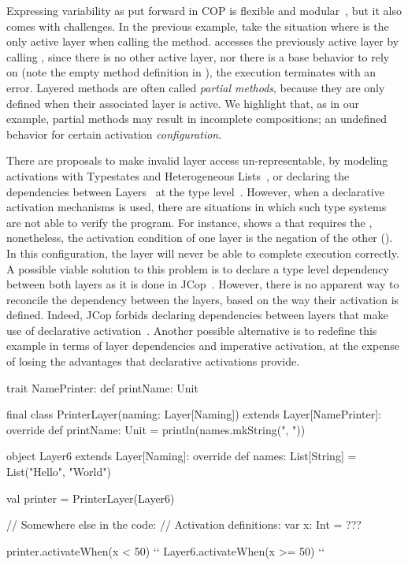 Expressing variability as put forward in \ac{COP} is flexible and modular~\cite{cardozo22}, but it also 
comes with challenges. In the previous example, take the situation where  is the only 
active layer when calling the  method.  accesses the previously active 
layer by calling , since there is no other active layer, nor there is a base behavior to 
rely on (note the empty method definition in ), the execution 
terminates with an error. Layered methods are often called 
\emph{partial methods}, because they are only defined when their associated layer is 
active. We highlight that, as in our example, partial methods may result in incomplete compositions;
an undefined behavior for certain activation \emph{configuration}.

There are proposals to make invalid layer access un-representable, by modeling activations with 
Typestates and Heterogeneous Lists~\cite{aotani15}, or declaring the dependencies between 
Layers~\cite{gonzalez11subc,cardozo12copn} at the type level~\cite{inoue14}.
However, when a declarative activation mechanisms is used, there are situations in which such type 
systems are not able to verify the program. For instance,  shows a 
 that requires the , nonetheless, the activation condition of 
one layer is the negation of the other 
(). 
In this configuration, the  layer will never be able to complete execution 
correctly. A possible viable solution to this problem is to declare a type level dependency between both 
layers as it is done in JCop~\cite{inoue14}. However, there is no apparent way to reconcile the 
dependency between the layers, based on the way their activation is defined. Indeed, JCop forbids 
declaring dependencies between layers that make use of declarative activation~\cite{inoue14}.
Another possible alternative is to redefine this example in terms of layer dependencies and 
imperative activation, at the expense of losing the advantages that declarative activations provide.

\begin{scala}[label=lst:contradictory-activations, caption={Layers with Contradictory Activation Conditions}]
trait NamePrinter:
  def printName: Unit

final class PrinterLayer(naming: Layer[Naming]) extends Layer[NamePrinter]:
  override def printName: Unit =
    println(names.mkString(", "))

object Layer6 extends Layer[Naming]:
  override def names: List[String] =
    List("Hello", "World")

val printer = PrinterLayer(Layer6)

// Somewhere else in the code:
// Activation definitions: 
var x: Int = ???

printer.activateWhen(x < 50) `\label{ln:contradictory-activations.conditions-init}`
Layer6.activateWhen(x >= 50) `\label{ln:contradictory-activations.conditions-end}`
\end{scala}

